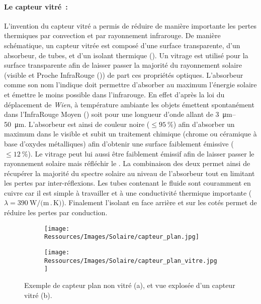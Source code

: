 \paragraph{Le capteur vitré~:} %
\label{par:le_capteur_vitre}
L’invention du capteur vitré a permis de réduire de manière importante les pertes
thermiques par convection et par rayonnement infrarouge. De manière schématique, un
capteur vitrée est composé d’une surface transparente, d’un absorbeur, de tubes, et d’un
isolant thermique (). Un vitrage est utilisé pour la
surface transparente afin de laisser passer la majorité du rayonnement solaire (visible et
Proche InfraRouge ()) de part ces propriétés optiques. L’absorbeur comme son nom
l’indique doit permettre d’absorber au maximum l’énergie solaire et émettre le moins possible dans
l’infrarouge. En effet d’après la loi du déplacement de \textit{Wien}, à température
ambiante les objets émettent spontanément dans l’InfraRouge Moyen () soit pour
une longueur d’onde allant de \SIrange{3}{50}{\micro\metre}. L’absorbeur est ainsi de
couleur noire ($\leq \SI{95}{\percent}$) afin d’absorber un maximum dans le visible et
subit un traitement chimique (chrome ou céramique à base d’oxydes métalliques) afin
d’obtenir une surface faiblement émissive ($\leq \SI{12}{\percent}$). Le vitrage peut lui
aussi être faiblement émissif afin de laisser passer le rayonnement solaire mais réfléchir
le . La combinaison des deux permet ainsi de récupérer la majorité du spectre
solaire au niveau de l’absorbeur tout en limitant les pertes par inter-réflexions. Les
tubes contenant le fluide sont couramment en cuivre car il est simple à travailler et à
une conductivité thermique importante ($\lambda = \SI{390}{\watt\per(\metre\period\kelvin)}$).
Finalement l’isolant en face arrière et sur les cotés permet de réduire les pertes par conduction.

\begin{figure}
    \centering
    \begin{subfigure}[b]{0.4\textwidth}
        \centering
        \texttt{[image: Ressources/Images/Solaire/capteur\_plan.jpg]}
        \caption{}
        \label{fig:capteur_plan}
    \end{subfigure}
    \quad
    \begin{subfigure}[b]{0.5\textwidth}
        \centering
        \texttt{[image: Ressources/Images/Solaire/capteur\_plan\_vitre.jpg]}
        \caption{}
        \label{fig:capteur_plan_vitre}
    \end{subfigure}
    \caption[Description des capteurs plans]
             {Exemple de capteur plan non vitré (a), et vue explosée d’un capteur vitré (b).}
    \label{fig:capteurs_plan}
\end{figure}


